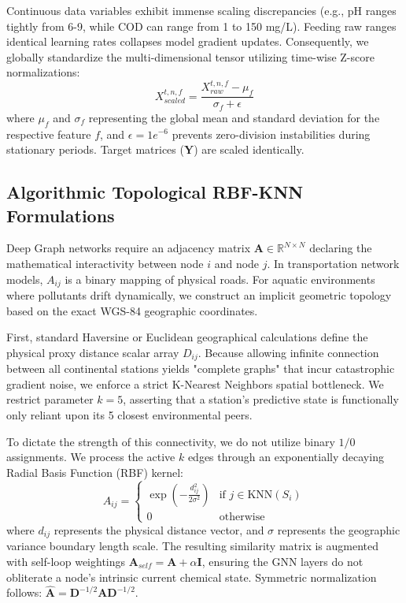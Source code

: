 \documentclass[journal,10pt,twocolumn]{IEEEtran}
\begin{document}
Continuous data variables exhibit immense scaling discrepancies (e.g., pH ranges tightly from 6-9, while COD can range from 1 to 150 mg/L). Feeding raw ranges identical learning rates collapses model gradient updates. Consequently, we globally standardize the multi-dimensional tensor utilizing time-wise Z-score normalizations:
\begin{equation}
    X_{scaled}^{t, n, f} = \frac{X_{raw}^{t, n, f} - \mu_{f}}{\sigma_{f} + \epsilon}
\end{equation}
where $\mu_f$ and $\sigma_f$ representing the global mean and standard deviation for the respective feature $f$, and $\epsilon = 1e^{-6}$ prevents zero-division instabilities during stationary periods. Target matrices ($\mathbf{Y}$) are scaled identically.

\subsection{Algorithmic Topological RBF-KNN Formulations}
Deep Graph networks require an adjacency matrix $\mathbf{A} \in \mathbb{R}^{N \times N}$ declaring the mathematical interactivity between node $i$ and node $j$. In transportation network models, $A_{ij}$ is a binary mapping of physical roads. For aquatic environments where pollutants drift dynamically, we construct an implicit geometric topology based on the exact WGS-84 geographic coordinates.

First, standard Haversine or Euclidean geographical calculations define the physical proxy distance scalar array $D_{ij}$. Because allowing infinite connection between all continental stations yields "complete graphs" that incur catastrophic gradient noise, we enforce a strict K-Nearest Neighbors spatial bottleneck. We restrict parameter $k=5$, asserting that a station's predictive state is functionally only reliant upon its 5 closest environmental peers.

To dictate the strength of this connectivity, we do not utilize binary $1/0$ assignments. We process the active $k$ edges through an exponentially decaying Radial Basis Function (RBF) kernel:
\begin{equation}
A_{ij} = 
\begin{cases} 
\exp\left(-\frac{d_{ij}^2}{2\sigma^2}\right) & \text{if } j \in \text{KNN}(S_i) \\
0 & \text{otherwise}
\end{cases}
\end{equation}
where $d_{ij}$ represents the physical distance vector, and $\sigma$ represents the geographic variance boundary length scale. The resulting similarity matrix is augmented with self-loop weightings $\mathbf{A}_{self} = \mathbf{A} + \alpha\mathbf{I}$, ensuring the GNN layers do not obliterate a node's intrinsic current chemical state. Symmetric normalization follows: $\mathbf{\hat{A}} = \mathbf{D}^{-1/2} \mathbf{A} \mathbf{D}^{-1/2}$.
\end{document}
